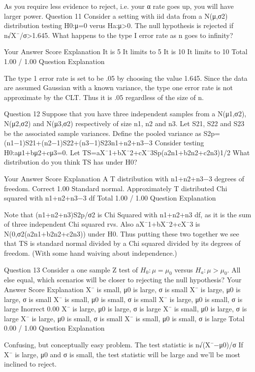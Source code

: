 As you require less evidence to reject, i.e. your α rate goes up, you will have larger power.
Question 11
Consider a setting with iid data from a N(μ,σ2) distribution testing H0:μ=0 verus Ha:μ>0. The null hypothesis is rejected if n√X¯/σ>1.645. What happens to the type I error rate as n goes to infinity?

Your Answer		Score	Explanation
It is 5%
It limits to 5%
It is 10%
It limits to 10%
Total		1.00 / 1.00	
Question Explanation

The type 1 error rate is set to be .05 by choosing the value 1.645. Since the data are assumed Gaussian with a known variance, the type one error rate is not approximate by the CLT. Thus it is .05 regardless of the size of n.

Question 12
Suppose that you have three independent samples from a N(μ1,σ2), N(μ2,σ2) and N(μ3,σ2) respectively of size n1, n2 and n3. Let S21, S22 and S23 be the associated sample variances. Define the pooled variance as
S2p=(n1−1)S21+(n2−1)S22+(n3−1)S23n1+n2+n3−3
Consider testing H0:aμ1+bμ2+cμ3=0. Let
TS=aX¯1+bX¯2+cX¯3Sp(a2n1+b2n2+c2n3)1/2
What distribution do you think TS has under H0?

Your Answer		Score	Explanation
A T distribution with n1+n2+n3−3 degrees of freedom.	Correct	1.00	
Standard normal.			
Approximately T distributed			
Chi squared with n1+n2+n3−3 df			
Total		1.00 / 1.00	
Question Explanation

Note that (n1+n2+n3)S2p/σ2 is Chi Squared with n1+n2+n3 df, as it is the sum of three independent Chi squared rvs. Also aX¯1+bX¯2+cX¯3 is N(0,σ2(a2n1+b2n2+c2n3)) under H0. Thus putting these two together we see that TS is standard normal divided by a Chi squared divided by its degrees of freedom. (With some hand waiving about independence.)

Question 13
Consider a one sample Z test of $H_0 : \mu = \mu_0$ versus $H_a : \mu > \mu_0$. All else equal, which scenarios will be closer to rejecting the null hypothesis?
Your Answer		Score	Explanation
X¯ is small, μ0 is large, σ is small			
X¯ is large, μ0 is large, σ is small			
X¯ is small, μ0 is small, σ is small			
X¯ is large, μ0 is small, σ is large	Inorrect	0.00	
X¯ is large, μ0 is large, σ is large			
X¯ is small, μ0 is large, σ is large			
X¯ is large, μ0 is small, σ is small			
X¯ is small, μ0 is small, σ is large			
Total		0.00 / 1.00	
Question Explanation

Confusing, but conceptually easy problem. The test statistic is n√(X¯−μ0)/σ If X¯ is large, μ0 and σ is small, the test statistic will be large and we'll be most inclined to reject.
